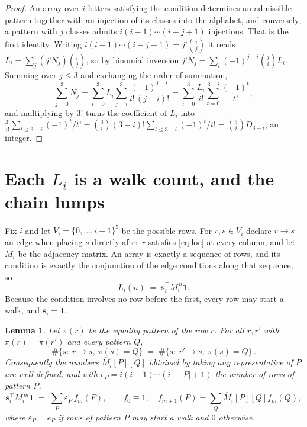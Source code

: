 \documentclass[11pt,a4paper]{article}
\theoremstyle{plain}
\newtheorem{lemma}[theorem]{Lemma}
\theoremstyle{definition}
\begin{document}
\begin{proof}
An array over $i$ letters satisfying the condition determines an admissible pattern together
with an injection of its classes into the alphabet, and conversely; a pattern with $j$
classes admits $i(i-1)\cdots(i-j+1)$ injections. That is the first identity. Writing
$i(i-1)\cdots(i-j+1)=j!\binom{i}{j}$ it reads $L_i=\sum_j (j!N_j)\binom{i}{j}$, so by
binomial inversion $j!N_j=\sum_{i}(-1)^{j-i}\binom{j}{i}L_i$. Summing over
$j\le 3$ and exchanging the order of summation,
\[
\sum_{j=0}^{3}N_j=\sum_{i=0}^{3}L_i\sum_{j=i}^{3}\frac{(-1)^{j-i}}{i!\,(j-i)!}
=\sum_{i=0}^{3}\frac{L_i}{i!}\sum_{t=0}^{3-i}\frac{(-1)^t}{t!} ,
\]
and multiplying by $3!$ turns the coefficient of $L_i$ into
$\frac{3!}{i!}\sum_{t\le 3-i}(-1)^t/t!=\binom{3}{i}(3-i)!\sum_{t\le 3-i}(-1)^t/t!
=\binom{3}{i}D_{3-i}$, an integer.
\end{proof}

\section{Each $L_i$ is a walk count, and the chain lumps}

Fix $i$ and let $V_i=\{0,\dots,i-1\}^{5}$ be the possible rows. For $r,s\in V_i$
declare $r\to s$ an edge when placing $s$ directly after $r$ satisfies \eqref{eq:loc} at
every column, and let $M_i$ be the adjacency matrix. An array is exactly a sequence of
rows, and its condition is exactly the conjunction of the edge conditions along that
sequence, so
\[
L_i(n)\;=\;\mathbf{s}_i^{\!\top}M_i^{\,n}\mathbf{1} .
\]
Because the condition involves no row before the first, every
row may start a walk, and $\mathbf{s}_i=\mathbf{1}$.

\begin{lemma}\label{lem:lump}
Let $\pi(r)$ be the equality pattern of the row $r$. For all $r,r'$ with
$\pi(r)=\pi(r')$ and every pattern $Q$,
\[
\#\{s:\ r\to s,\ \pi(s)=Q\}\;=\;\#\{s:\ r'\to s,\ \pi(s)=Q\}\, .
\]
Consequently the numbers $\widehat M_i[P][Q]$ obtained by taking any representative of $P$
are well defined, and with $e_P=i(i-1)\cdots(i-|P|+1)$ the number of rows of pattern $P$,
\[
\mathbf{s}_i^{\!\top}M_i^{\,m}\mathbf{1}\;=\;\sum_P \varepsilon_P\,f_m(P),
\qquad f_0\equiv1,\quad f_{m+1}(P)=\sum_Q\widehat M_i[P][Q]f_m(Q),
\]
where $\varepsilon_P=e_P$ if rows of pattern $P$ may start a walk and $0$ otherwise.
\end{lemma}
\end{document}
